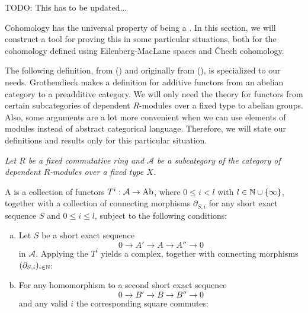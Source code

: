 TODO: This has to be updated...

Cohomology has the universal property of being a .
In this section, we will construct a tool for proving this in some particular situations,
both for the cohomology defined using Eilenberg-MacLane spaces and \v{C}hech cohomology.

The following definition, from (\cite[2.1]{tohoku-translation}) and originally from (\cite{tohoku1957}), is specialized to our needs.
Grothendieck makes a definition for additive functors from an abelian category to a preadditive category.
We will only need the theory for functors from certain subcategories of dependent $R$-modules over a fixed type to abelian groups.
Also, some arguments are a lot more convenient when we can use elements of modules instead of abstract categorical language.
Therefore, we will state our definitions and results only for this particular situation.

\emph{Let $R$ be a fixed commutative ring and $\mathcal A$ be a subcategory of the category of dependent $R$-modules over a fixed type $X$.}

\begin{definition}
  A  is a collection of functors $T^i:\mathcal A\to \operatorname{Ab}$, where $0\leq i < l$ with $l\in\mathbb{N}\cup\{\infty\}$,
  together with a collection of connecting morphisms $\partial_{S,i}$ for any short exact sequence $S$ and $0\leq i\le l$, subject to the following conditions:
  \begin{enumerate}[(a)]
  \item Let $S$ be a short exact sequence
    \[ 0\to A'\to A\to A''\to 0\]
    in $\mathcal A$. Applying the $T^i$ yields a complex, together with connecting morphisms $(\partial_{S,i})_{i\in\mathbb{N}}$:
    \begin{center}
    \end{center}
  \item For any homomorphism to a second short exact sequence
    \[ 0\to B'\to B\to B''\to 0\]
    and any valid $i$ the corresponding square commutes:
    \begin{center}
    \end{center}
  \end{enumerate}
\end{definition}

